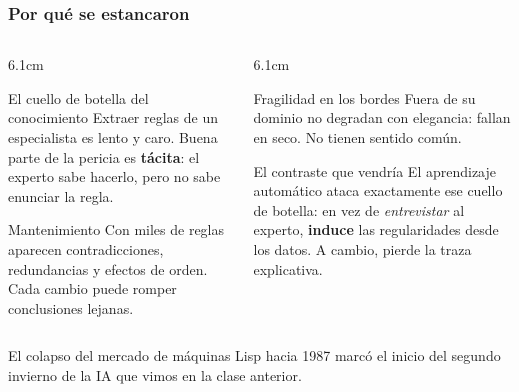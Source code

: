 \documentclass[aspectratio=169, 10pt]{beamer}
\begin{document}
\begin{frame}
\frametitle{Por qué se estancaron}
\begin{columns}[T]
\begin{column}{6.1cm}
\begin{alertblock}{El cuello de botella del conocimiento}
Extraer reglas de un especialista es lento y caro. Buena parte de la pericia es \textbf{t\'acita}: el experto sabe hacerlo, pero no sabe enunciar la regla.
\end{alertblock}
\begin{alertblock}{Mantenimiento}
Con miles de reglas aparecen contradicciones, redundancias y efectos de orden. Cada cambio puede romper conclusiones lejanas.
\end{alertblock}
\end{column}
\begin{column}{6.1cm}
\begin{alertblock}{Fragilidad en los bordes}
Fuera de su dominio no degradan con elegancia: fallan en seco. No tienen sentido com\'un.
\end{alertblock}
\begin{block}{El contraste que vendría}
El aprendizaje autom\'atico ataca exactamente ese cuello de botella: en vez de \emph{entrevistar} al experto, \textbf{induce} las regularidades desde los datos. A cambio, pierde la traza explicativa.
\end{block}
\end{column}
\end{columns}
\vspace{0.4em}
\footnotesize El colapso del mercado de m\'aquinas Lisp hacia 1987 marc\'o el inicio del segundo invierno de la IA que vimos en la clase anterior.
\end{frame}
\end{document}
